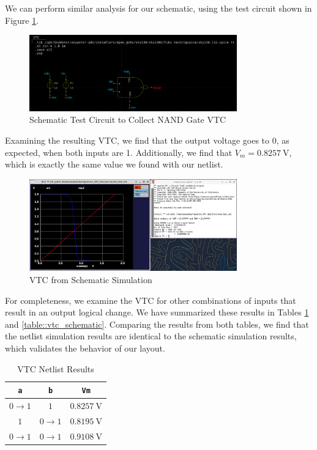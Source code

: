 \documentclass{article}
\begin{document}
	\noindent We can perform similar analysis for our schematic, using the test circuit shown in Figure \ref{fig::nand_vtc_schem_test_circuit}.
	
	\begin{figure}[H]
		\centerline{\includegraphics[width=0.8\textwidth]{nand_vtc_test_circuit.png}}
		\caption{Schematic Test Circuit to Collect NAND Gate VTC}
		\label{fig::nand_vtc_schem_test_circuit}
	\end{figure}
	
	\noindent Examining the resulting VTC, we find that the output voltage goes to 0, as expected, when both inputs are 1. Additionally, we find that $V_m = 0.8257\ \text{V}$, which is exactly the same value we found with our netlist.
	
	\begin{figure}[H]
		\centerline{\includegraphics[width=0.8\textwidth]{nand_vtc_schem.png}}
		\caption{VTC from Schematic Simulation}
		\label{fig::nand_vtc_schem}
	\end{figure}	
	
	For completeness, we examine the VTC for other combinations of inputs that result in an output logical change. We have summarized these results in Tables \ref{table::vtc_netlist} and \ref{table::vtc_schematic}. Comparing the results from both tables, we find that the netlist simulation results are identical to the schematic simulation results, which validates the behavior of our layout. 
	
	\begin{table}[H]
	\begin{center}
	\caption{VTC Netlist Results}
	\label{table::vtc_netlist}
	\begin{tabular}{| c | c | c |}
		\hline
		\texttt{a} & \texttt{b} & \texttt{Vm}\\
		\hline	
		$0 \rightarrow 1$ & $1$ & $0.8257\ \text{V}$\\
		\hline	
		$1$ & $0 \rightarrow 1$ & $0.8195\ \text{V}$\\
		\hline	
		$0 \rightarrow 1$ & $0 \rightarrow 1$ & $0.9108\ \text{V}$\\
		\hline
	\end{tabular}
	\end{center}
	\end{table}
	
\end{document}
